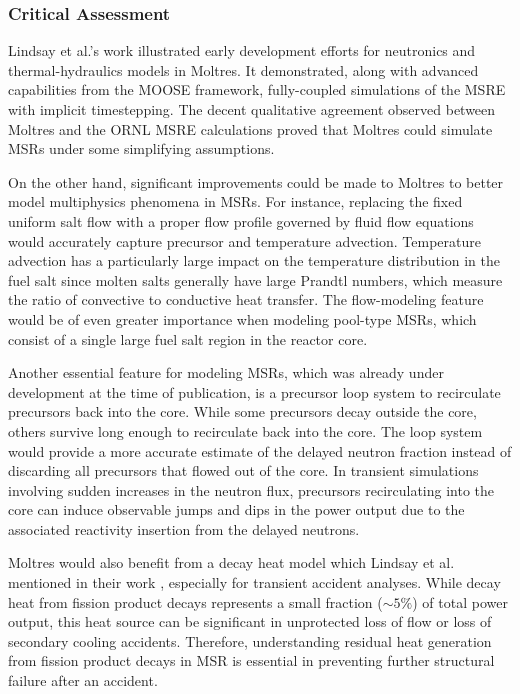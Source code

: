 \subsubsection{Critical Assessment} \label{sec:msre-critique}

Lindsay et al.'s work illustrated early development efforts for neutronics and thermal-hydraulics
models in Moltres. It demonstrated, along with advanced capabilities from the \gls{MOOSE}
framework, fully-coupled simulations of the \gls{MSRE} with implicit timestepping. The
decent qualitative agreement observed between Moltres and the \gls{ORNL}
\gls{MSRE} calculations proved that Moltres could simulate
\glspl{MSR} under some simplifying assumptions.

On the other hand, significant improvements could be made to Moltres to better
model multiphysics phenomena in \glspl{MSR}. For instance, replacing the
fixed uniform salt flow with a proper flow profile governed by fluid flow
equations would accurately capture precursor and temperature advection.
Temperature advection has a particularly large impact on the temperature
distribution in the fuel salt since molten salts generally have large Prandtl
numbers, which measure the ratio of convective to conductive heat transfer.
The flow-modeling feature would be of even greater importance when modeling
pool-type \glspl{MSR}, which consist of a single large fuel salt region in the
reactor core.

Another essential feature for modeling \glspl{MSR}, which was already under
development at the time of publication, is a precursor loop
system to recirculate precursors back into the core. While some precursors
decay outside the core, others survive long enough to recirculate back into the
core. The loop system would provide a more accurate estimate of the delayed
neutron fraction instead of discarding all precursors that flowed out of
the core. In transient simulations involving sudden increases in the neutron
flux, precursors recirculating into the core can induce observable jumps and
dips in the power output due to the associated reactivity insertion from the
delayed neutrons.

Moltres would also benefit from a decay heat model which Lindsay
et al. mentioned in their work \cite{lindsay_introduction_2018},
especially for transient accident analyses. While decay heat from fission
product decays represents a small fraction ($\sim5\%$) of total power output,
this heat source can be significant in unprotected loss of flow or loss of
secondary cooling accidents. Therefore, understanding residual heat generation
from fission product decays in \gls{MSR} is essential in preventing further
structural failure after an accident.

